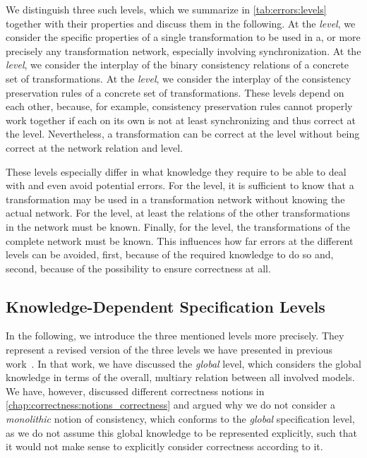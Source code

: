 We distinguish three such levels, which we summarize in \autoref{tab:errors:levels} together with their properties and discuss them in the following.
At the \emph{\leveltransformation level}, we consider the specific properties of a single transformation to be used in a, or more precisely any transformation network, especially involving synchronization.
At the \emph{\levelnetworkrelation level}, we consider the interplay of the binary consistency relations of a concrete set of transformations.
At the \emph{\levelnetworkrule level}, we consider the interplay of the consistency preservation rules of a concrete set of transformations.
These levels depend on each other, because, for example, consistency preservation rules cannot properly work together if each on its own is not at least synchronizing and thus correct at the \leveltransformation level.
Nevertheless, a transformation can be correct at the \leveltransformation level without being correct at the network relation and \levelnetworkrule level.

These levels especially differ in what knowledge they require to be able to deal with and even avoid potential errors.
For the \leveltransformation level, it is sufficient to know that a transformation may be used in a transformation network without knowing the actual network.
For the \levelnetworkrelation level, at least the relations of the other transformations in the network must be known.
Finally, for the \levelnetworkrule level, the transformations of the complete network must be known.
This influences how far errors at the different levels can be avoided, first, because of the required knowledge to do so and, second, because of the possibility to ensure correctness at all.


\subsection{Knowledge-Dependent Specification Levels}

In the following, we introduce the three mentioned levels more precisely.
They represent a revised version of the three levels we have presented in previous work~.
In that work, we have discussed the \emph{global} level, which considers the global knowledge in terms of the overall, multiary relation between all involved models.
We have, however, discussed different correctness notions in \autoref{chap:correctness:notions_correctness} and argued why we do not consider a \emph{monolithic} notion of consistency, which conforms to the \emph{global} specification level, as we do not assume this global knowledge to be represented explicitly, such that it would not make sense to explicitly consider correctness according to it.

